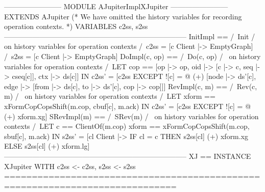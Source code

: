 \documentclass[preview, border={5pt 0pt 5pt 1pt}]{standalone}
\begin{document}
\begin{tla}
------------------------ MODULE AJupiterImplXJupiter ------------------------
EXTENDS AJupiter
(* We have omitted the history variables for recording operation contexts. *)
VARIABLES c2ss, s2ss
-----------------------------------------------------------------------------
InitImpl == /\ Init
            /\ \* on history variables for operation contexts
            /\ c2ss = [c \in Client |-> EmptyGraph]
            /\ s2ss = [c \in Client |-> EmptyGraph]
DoImpl(c, op) == /\ Do(c, op)
                 /\ \* on history variables for operation contexts
                 /\ LET cop == [op |-> op,
                               oid |-> [c |-> c, seq |-> cseq[c]], ctx |-> ds[c]]
                    IN  c2ss' = [c2ss EXCEPT ![c] = 
                      @ (+) [node |-> {ds'[c]},
                             edge |-> {[from |-> ds[c], to |-> ds'[c], cop |-> cop]}]]
RevImpl(c, m) == /\ Rev(c, m)
                 /\ \* on history variables for operation contexts
                 /\ LET xform == xFormCopCopsShift(m.cop, cbuf[c], m.ack)
                    IN  c2ss' = [c2ss EXCEPT ![c] = @ (+) xform.xg]
SRevImpl(m) == /\ SRev(m)
               /\ \* on history variables for operation contexts
               /\ LET c == ClientOf(m.cop)
                  xform == xFormCopCopsShift(m.cop, sbuf[c], m.ack)
                  IN  s2ss' = [cl \in Client |-> 
                                    IF cl = c THEN s2ss[cl] (+) xform.xg
                                              ELSE s2ss[cl] (+) xform.lg]
-----------------------------------------------------------------------------
XJ == INSTANCE XJupiter WITH c2ss <- c2ss, s2ss <- s2ss
=============================================================================
\end{tla}
\end{document}

